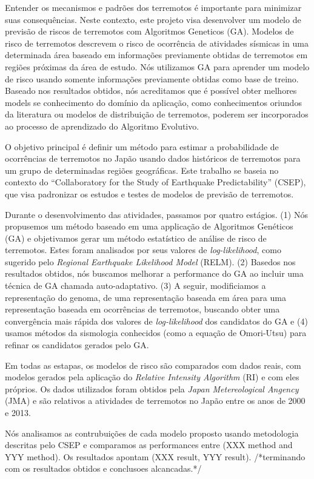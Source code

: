 Entender os mecanismos e padrões dos terremotos é importante para minimizar suas consequências. Neste contexto, este projeto visa desenvolver um modelo de previsão de riscos de terremotos com Algoritmos Geneticos (GA). Modelos de risco de terremotos descrevem o risco de ocorrência de atividades sísmicas in uma determinada área baseado em informações previamente obtidas de terremotos em regiões próximas da área de estudo. Nós utilizamos GA para aprender um modelo de risco usando somente informações previamente obtidas como base de treino. Baseado nos resultados obtidos, nós acreditamos que é possível obter melhores models se conhecimento do domínio da aplicação, como conhecimentos oriundos da literatura ou modelos de distribuição de terremotos, poderem ser incorporados ao processo de aprendizado do Algoritmo Evolutivo.

  O objetivo principal é definir um método para estimar a probabilidade de ocorrências de terremotos no Japão usando dados históricos de terremotos para um grupo de determinadas regiões geográficas. Este trabalho se baseia no contexto do  “Collaboratory for the Study of Earthquake Predictability” (CSEP), que visa padronizar os estudos e testes de modelos de previsão de terremotos. 
  
  Durante o desenvolvimento das atividades, passamos por quatro estágios. (1) Nós propusemos um método baseado em uma applicação de Algoritmos Genéticos (GA) e objetivamos gerar um método estatístico de análise de risco de terremotos. Estes foram analisados por seus valores de \textit{log-likelihood}, como sugerido pelo \textit{Regional Earthquake Likelihood Model} (RELM). (2) Basedos nos resultados obtidos, nós buscamos melhorar a performance do GA ao incluir uma técnica de GA chamada auto-adaptativo. (3) A seguir, modificiamos a representação do genoma, de uma representação baseada em área para uma representação baseada em ocorrências de terremotos, buscando obter uma convergência mais rápida dos valores de \textit{log-likelihood} dos candidatos do GA e (4) usamos métodos da sismologia conhecidos (como a equação de Omori-Utsu) para refinar os candidatos gerados pelo GA.
  
Em todas as estapas, os modelos de risco são comparados com dados reais, com modelos gerados pela aplicação do \textit{Relative Intensity Algorithm} (RI) e com eles próprios. Os dados utilizados foram obtidos pela \textit{Japan Metereological Angency} (JMA) e são relativos a atividades de terremotos no Japão entre os anos de 2000 e 2013.

Nós analisamos as contrubuições de cada modelo proposto usando metodologia descritas pelo CSEP e comparamos as performances entre (XXX method and YYY method). Os resultados apontam (XXX result, YYY result).
/*terminando com os resultados obtidos e conclusoes alcancadas.*/